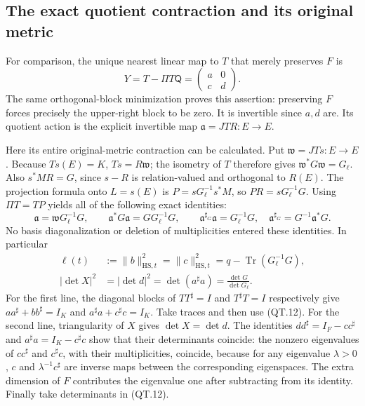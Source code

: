 \subsection{The exact quotient contraction and its original metric}

For comparison, the unique nearest linear map to \(T\) that merely
preserves \(F\) is
\[
 Y=T-\Pi T\mathsf Q
  =\begin{pmatrix}a&0\\c&d\end{pmatrix}.
 \tag{QT.11}\label{CFStage:eq:qt-descent}
\]
The same orthogonal-block minimization proves this assertion:
preserving \(F\) forces precisely the upper-right block to be zero.
It is invertible since \(a,d\) are. Its quotient action is the
explicit invertible map
\(\mathfrak a=JTR:E\to E\).

Here its entire original-metric contraction can be calculated.
Put \(\mathfrak w=JTs:E\to E\).
Because \(Ts(E)=K\), \(Ts=R\mathfrak w\); the isometry of \(T\)
therefore gives \(\mathfrak w^*G\mathfrak w=G_\ell\).
Also \(s^*MR=G\), since \(s-R\) is relation-valued and orthogonal
to \(R(E)\). The projection formula onto \(L=s(E)\) is
\(P=sG_\ell^{-1}s^*M\), so \(PR=sG_\ell^{-1}G\).
Using \(\Pi T=TP\) yields all of the following exact identities:
\[
 \mathfrak a=\mathfrak wG_\ell^{-1}G,\qquad
 \mathfrak a^*G\mathfrak a=GG_\ell^{-1}G,\qquad
 \mathfrak a^{\sharp_G}\mathfrak a=G_\ell^{-1}G,
 \quad \mathfrak a^{\sharp_G}=G^{-1}\mathfrak a^*G.
 \tag{QT.12}\label{CFStage:eq:qt-quotientmetric}
\]
No basis diagonalization or deletion of multiplicities entered these
identities. In particular
\[
 \begin{split}
 \ell(t)&:=\|b\|_{\mathrm{HS},t}^2
       =\|c\|_{\mathrm{HS},t}^2
       =q-\operatorname{Tr}(G_\ell^{-1}G),\\
 |\det X|^2&=|\det d|^2
       =\det(a^\sharp a)
       =\frac{\det G}{\det G_\ell}.
 \end{split}
 \tag{QT.13}\label{CFStage:eq:qt-leakagedet}
\]
For the first line, the diagonal blocks of \(TT^\sharp=I\) and
\(T^\sharp T=I\) respectively give
\(aa^\sharp+bb^\sharp=I_K\) and
\(a^\sharp a+c^\sharp c=I_K\). Take traces and then use (QT.12).
For the second line, triangularity of \(X\) gives \(\det X=\det d\).
The identities
\(dd^\sharp=I_F-cc^\sharp\) and
\(a^\sharp a=I_K-c^\sharp c\) show that their determinants coincide:
the nonzero eigenvalues of \(cc^\sharp\) and \(c^\sharp c\),
with their multiplicities, coincide, because for any eigenvalue
\(\lambda>0\), \(c\) and \(\lambda^{-1}c^\sharp\) are inverse
maps between the corresponding eigenspaces. The extra dimension
of \(F\) contributes the eigenvalue one after subtracting from its
identity. Finally take determinants in (QT.12).

